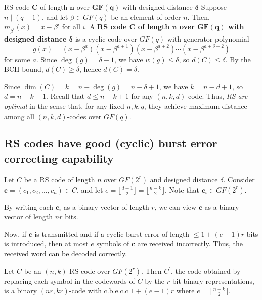 \begin{Definition}{RS code $ \symbf{C} $ of length $ \symbf{n} $ over $ \symbf{GF(q)} $
        with designed distance $ \symbf{\delta} $}{}
    Suppose $ n\mid (q-1) $, and let $ \beta\in GF(q) $ be an element of order $ n $.
    Then, $ m_{\beta^i}(x)=x-\beta^i $ for all $ i $. A
    \textbf{RS code $ \symbf{C} $ of length $ \symbf{n} $ over $ \symbf{GF(q)} $
        with designed distance $ \symbf{\delta} $} is a cyclic code over $ GF(q) $
    with generator polynomial
    \[ g(x)=(x-\beta^{a})(x-\beta^{a+1})(x-\beta^{a+2})\cdots
        (x-\beta^{a+\delta-2}) \]
    for some $ a $. Since $ \deg(g)=\delta-1 $, we have $ w(g)\leqslant \delta $,
    so $ d(C)\leqslant \delta $. By the BCH bound, $ d(C)\geqslant \delta $,
    hence $ d(C)=\delta $.

    Since $ \dim(C)=k=n-\deg(g)=n-\delta+1 $, we have $ k=n-d+1 $,
    so $ d=n-k+1 $. Recall that $ d\leqslant n-k+1 $ for any $ (n,k,d) $-code.
    Thus, \emph{RS are optimal} in the sense that, for any fixed $ n,k,q $,
    they achieve maximum distance among all $ (n,k,d) $-codes over $ GF(q) $.
\end{Definition}

\subsection*{RS codes have good (cyclic) burst error correcting capability}

Let $ C $ be a RS code of length $ n $ over $ GF(2^r) $ and designed
distance $ \delta $. Consider $ \symbf{c}=(c_1,c_2,\ldots ,c_n)\in C $,
and let $ e=\lfloor\frac{d-1}{2} \rfloor =\lfloor\frac{n-k}{2} \rfloor $.
Note that $ \symbf{c}_i\in GF(2^r) $.

By writing each $ \symbf{c}_i $ as a binary vector of length
$ r $, we can view $ \symbf{c} $ as a binary vector of length $ nr $ bits.

Now, if $ \symbf{c} $ is transmitted and if a cyclic burst error of length
$ \leqslant 1+(e-1)r $ bits is introduced, then at most $ e $
symbols of $ \symbf{c} $ are received incorrectly. Thus, the received
word can be decoded correctly.

\begin{Theorem}{}{}
    Let $ C $ be an $ (n,k) $-RS code over $ GF(2^r) $. Then
    $ C^{\prime} $, the code obtained by replacing each symbol
    in the codewords of $ C $ by the $ r $-bit binary representations,
    is a binary $ (nr,kr) $-code with c.b.e.c.c $ 1+(e-1)r $
    where $ e=\lfloor \frac{n-k}{2} \rfloor $.
\end{Theorem}

